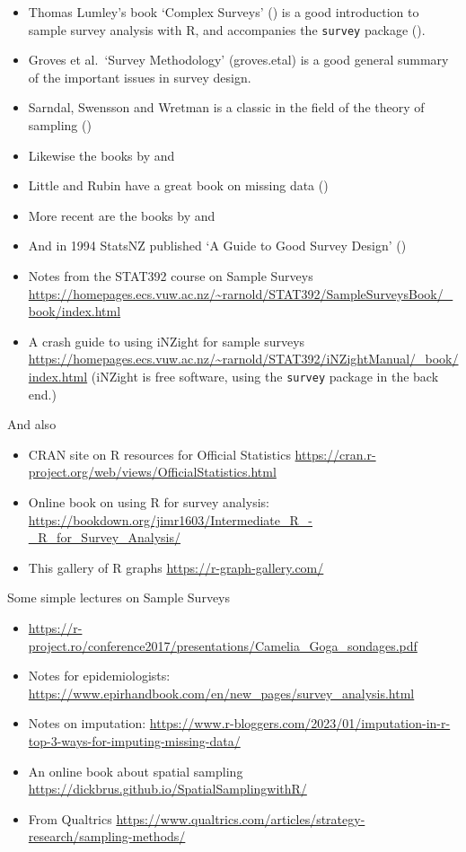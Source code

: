 \documentclass[
]{book}
\providecommand{\tightlist}{%
  \setlength{\itemsep}{0pt}\setlength{\parskip}{0pt}}
\begin{document}
\begin{itemize}
\tightlist
\item
  Thomas Lumley's book `Complex Surveys' (\citet{Lumley2010}) is a good introduction to sample survey analysis with R,
  and accompanies the \texttt{survey} package (\citet{survey2004}).
\item
  Groves et al.~`Survey Methodology' (groves.etal) is a good general summary of the important issues in survey design.
\item
  Sarndal, Swensson and Wretman is a classic in the field of the theory of sampling (\citet{ssw})
\item
  Likewise the books by \citet{cochran} and \citet{kish}
\item
  Little and Rubin have a great book on missing data (\citet{littlerubin})
\item
  More recent are the books by \citet{lohr} and \citet{scheaffer.mendenhall.ott}
\item
  And in 1994 StatsNZ published `A Guide to Good Survey Design' (\citet{statsnz})
\item
  Notes from the STAT392 course on Sample Surveys
  \url{https://homepages.ecs.vuw.ac.nz/~rarnold/STAT392/SampleSurveysBook/_book/index.html}
\item
  A crash guide to using iNZight for sample surveys
  \url{https://homepages.ecs.vuw.ac.nz/~rarnold/STAT392/iNZightManual/_book/index.html}
  (iNZight is free software, using the \texttt{survey} package in the back end.)
\end{itemize}

And also

\begin{itemize}
\tightlist
\item
  CRAN site on R resources for Official Statistics \url{https://cran.r-project.org/web/views/OfficialStatistics.html}
\item
  Online book on using R for survey analysis:
  \url{https://bookdown.org/jimr1603/Intermediate_R_-_R_for_Survey_Analysis/}
\item
  This gallery of R graphs \url{https://r-graph-gallery.com/}
\end{itemize}

Some simple lectures on Sample Surveys

\begin{itemize}
\tightlist
\item
  \url{https://r-project.ro/conference2017/presentations/Camelia_Goga_sondages.pdf}
\item
  Notes for epidemiologists: \url{https://www.epirhandbook.com/en/new_pages/survey_analysis.html}
\item
  Notes on imputation: \url{https://www.r-bloggers.com/2023/01/imputation-in-r-top-3-ways-for-imputing-missing-data/}
\item
  An online book about spatial sampling \url{https://dickbrus.github.io/SpatialSamplingwithR/}
\item
  From Qualtrics \url{https://www.qualtrics.com/articles/strategy-research/sampling-methods/}
\end{itemize}
\end{document}
